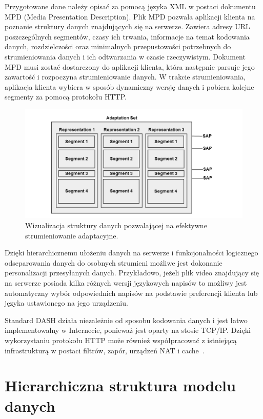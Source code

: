 Przygotowane dane należy opisać za pomocą języka XML w postaci dokumentu MPD (Media Presentation Description). Plik MPD pozwala aplikacji klienta na poznanie struktury danych znajdujących się na serwerze. Zawiera adresy URL poszczególnych segmentów, czasy ich trwania, informacje na temat kodowania danych, rozdzielczości oraz minimalnych przepustowości potrzebnych do strumieniowania danych i ich odtwarzania w czasie rzeczywistym. Dokument MPD musi zostać dostarczony do aplikacji klienta, która następnie parsuje jego zawartość i rozpoczyna strumieniowanie danych. W trakcie strumieniowania, aplikacja klienta wybiera w sposób dynamiczny wersję danych i pobiera kolejne segmenty za pomocą protokołu HTTP.

\begin{figure}[h!]
	\centering
		\includegraphics[width=\linewidth]{segmentalignment}
	\caption{Wizualizacja struktury danych pozwalającej na efektywne strumieniowanie adaptacyjne.}
	\label{fig:segmentalignment}
\end{figure}

Dzięki hierarchicznemu ułożeniu danych na serwerze i funkcjonalności logicznego odseparowania danych do osobnych strumieni możliwe jest dokonanie personalizacji przesyłanych danych. Przykładowo, jeżeli plik video znajdujący się na serwerze posiada kilka różnych wersji językowych napisów to możliwy jest automatyczny wybór odpowiednich napisów na podstawie preferencji klienta lub języka ustawionego na jego urządzeniu.
 
Standard DASH działa niezależnie od sposobu kodowania danych i jest łatwo implementowalny w Internecie, ponieważ jest oparty na stosie TCP/IP. Dzięki wykorzystaniu protokołu HTTP może również współpracować z istniejącą infrastrukturą w postaci filtrów, zapór, urządzeń NAT i cache~\cite{DASH}.

\section{Hierarchiczna struktura modelu danych}
\label{sec:structure}

